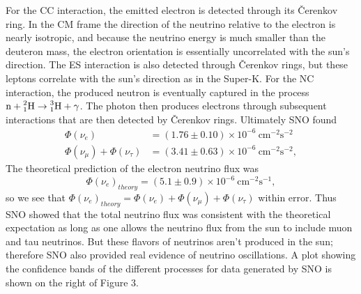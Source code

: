 For the CC interaction, the
emitted electron is detected through its \v{C}erenkov ring. In the CM frame
the direction of the neutrino relative to the electron is nearly isotropic, and
because the neutrino energy is much smaller than the deuteron mass, the
electron orientation is essentially uncorrelated with the sun's direction.
The ES interaction is also detected through \v{C}erenkov rings, but these
leptons correlate with the sun's direction as in the Super-K. For the NC
interaction, the produced neutron is eventually captured in the process
$\text{n}+\prescript{2}{1}{\text{H}}\to\prescript{3}{1}{\text{H}}+\gamma$.
The photon then produces electrons through subsequent interactions that are
then detected by \v{C}erenkov rings. Ultimately SNO found
\begin{equation}
  \begin{aligned}
    \Phi(\nu_e)&=(1.76\pm0.10)\times10^{-6}~\text{cm}^{-2}\text{s}^{-2} \\
    \Phi(\nu_\mu)+\Phi(\nu_\tau)
               &=(3.41\pm0.63)\times10^{-6}~\text{cm}^{-2}\text{s}^{-2},
  \end{aligned}
\end{equation}
The theoretical prediction of the electron neutrino flux was
\begin{equation}
  \Phi(\nu_e)_{theory}=(5.1\pm0.9)\times10^{-6}~\text{cm}^{-2}\text{s}^{-1}, 
\end{equation}
so we see that $\Phi(\nu_e)_{theory}=\Phi(\nu_e)+\Phi(\nu_\mu)+\Phi(\nu_\tau)$
within error. Thus SNO showed that the total
neutrino flux was consistent with the theoretical expectation as long as
one allows the neutrino flux from the sun to include muon and tau neutrinos.
But these flavors of neutrinos aren't produced in the sun; therefore SNO also
provided real evidence of neutrino oscillations.
A plot showing the confidence bands of the different processes for data
generated by SNO is shown on the right of Figure 3.

